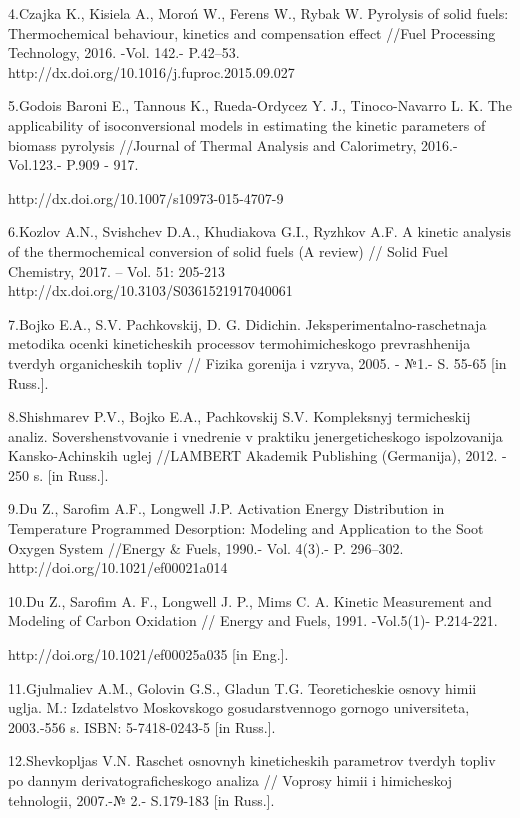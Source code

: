 4.Czajka K., Kisiela A., Moroń W., Ferens W., Rybak W. Pyrolysis of
solid fuels: Thermochemical behaviour, kinetics and compensation effect
//Fuel Processing Technology, 2016. -Vol. 142.- P.42--53.
http://dx.doi.org/10.1016/j.fuproc.2015.09.027

5.Godois Baroni E., Tannous K., Rueda-Ordycez Y. J., Tinoco-Navarro L.
K. The applicability of isoconversional models in estimating the kinetic
parameters of biomass pyrolysis //Journal of Thermal Analysis and
Calorimetry, 2016.- Vol.123.- P.909 - 917.

http://dx.doi.org/10.1007/s10973-015-4707-9

6.Kozlov A.N., Svishchev D.A., Khudiakova G.I., Ryzhkov A.F. A kinetic
analysis of the thermochemical conversion of solid fuels (A review) //
Solid Fuel Chemistry, 2017. -- Vol. 51: 205-213
http://dx.doi.org/10.3103/S0361521917040061

7.Bojko E.A., S.V. Pachkovskij, D. G. Didichin.
Jeksperimental\textquotesingle no-raschetnaja metodika ocenki
kineticheskih processov termohimicheskogo prevrashhenija tverdyh
organicheskih topliv // Fizika gorenija i vzryva, 2005. - №1.- S. 55-65
{[}in Russ.{]}.

8.Shishmarev P.V., Bojko E.A., Pachkovskij S.V. Kompleksnyj termicheskij
analiz. Sovershenstvovanie i vnedrenie v praktiku jenergeticheskogo
ispol\textquotesingle zovanija Kansko-Achinskih uglej //LAMBERT Akademik
Publishing (Germanija), 2012. - 250 s. {[}in Russ.{]}.

9.Du Z., Sarofim A.F., Longwell J.P. Activation Energy Distribution in
Temperature Programmed Desorption: Modeling and Application to the Soot
Oxygen System //Energy \& Fuels, 1990.- Vol. 4(3).- P. 296--302.
http://doi.org/10.1021/ef00021a014

10.Du Z., Sarofim A. F., Longwell J. P., Mims C. A. Kinetic Measurement
and Modeling of Carbon Oxidation // Energy and Fuels, 1991. -Vol.5(1)-
P.214-221.

http://doi.org/10.1021/ef00025a035 {[}in Eng.{]}.

11.Gjul\textquotesingle maliev A.M., Golovin G.S., Gladun T.G.
Teoreticheskie osnovy himii uglja. M.: Izdatel\textquotesingle stvo
Moskovskogo gosudarstvennogo gornogo universiteta, 2003.-556 s. ISBN:
5-7418-0243-5 {[}in Russ.{]}.

12.Shevkopljas V.N. Raschet osnovnyh kineticheskih parametrov tverdyh
topliv po dannym derivatograficheskogo analiza // Voprosy himii i
himicheskoj tehnologii, 2007.-№ 2.- S.179-183 {[}in Russ.{]}.

